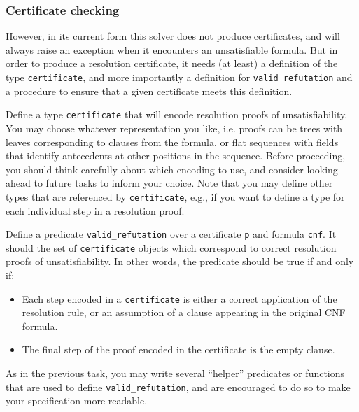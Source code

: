 \documentclass[11pt]{article}
\begin{document}
\subsubsection*{Certificate checking}
However, in its current form this solver does not produce certificates, and will always raise an exception when it encounters an unsatisfiable formula.
But in order to produce a resolution certificate, it needs (at least) a definition of the type \verb'certificate', and more importantly a definition for \verb'valid_refutation' and a procedure to ensure that a given certificate meets this definition.

\begin{task}[2 points]
Define a type \verb'certificate' that will encode resolution proofs of unsatisfiability.
You may choose whatever representation you like, i.e. proofs can be trees with leaves corresponding to clauses from the formula, or flat sequences with fields that identify antecedents at other positions in the sequence.
Before proceeding, you should think carefully about which encoding to use, and consider looking ahead to future tasks to inform your choice.
Note that you may define other types that are referenced by \verb'certificate', e.g., if you want to define a type for each individual step in a resolution proof.
\end{task}

\begin{task}[8 points]
Define a predicate \verb'valid_refutation' over a certificate \verb'p' and formula \verb'cnf'. 
It should the set of \verb'certificate' objects which correspond to correct resolution proofs of unsatisfiability.
In other words, the predicate should be true if and only if: 
\begin{itemize}
\item Each step encoded in a \verb'certificate' is either a correct application of the resolution rule, or an assumption of a clause appearing in the original CNF formula.
\item The final step of the proof encoded in the certificate is the empty clause.
\end{itemize}
As in the previous task, you may write several ``helper'' predicates or functions that are used to define \verb'valid_refutation', and are encouraged to do so to make your specification more readable.
\end{task}
\end{document}
